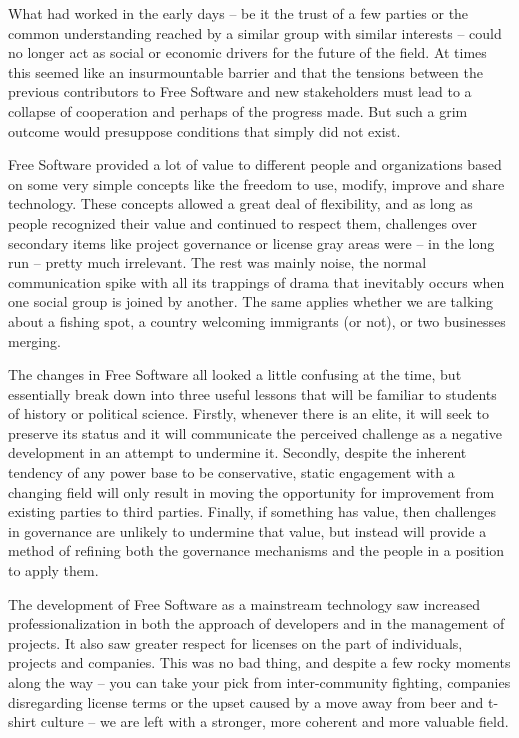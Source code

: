 What had worked in the early days -- be it the trust of a few parties or the
common understanding reached by a similar group with similar interests -- could
no longer act as social or economic drivers for the future of the field. At
times this seemed like an insurmountable barrier and that the tensions between
the previous contributors to Free Software and new stakeholders must lead to a
collapse of cooperation and perhaps of the progress made. But such a grim
outcome would presuppose conditions that simply did not exist.

Free Software provided a lot of value to different people and organizations
based on some very simple concepts like the freedom to use, modify, improve and
share technology. These concepts allowed a great deal of flexibility, and as
long as people recognized their value and continued to respect them, challenges
over secondary items like project governance or license gray areas were -- in
the long run -- pretty much irrelevant. The rest was mainly noise, the normal
communication spike with all its trappings of drama that inevitably occurs when
one social group is joined by another. The same applies whether we are talking
about a fishing spot, a country welcoming immigrants (or not), or two businesses
merging.

The changes in Free Software all looked a little confusing at the time, but
essentially break down into three useful lessons that will be familiar to
students of history or political science. Firstly, whenever there is an elite,
it will seek to preserve its status and it will communicate the perceived
challenge as a negative development in an attempt to undermine it. Secondly,
despite the inherent tendency of any power base to be conservative, static
engagement with a changing field will only result in moving the opportunity for
improvement from existing parties to third parties. Finally, if something has
value, then challenges in governance are unlikely to undermine that value, but
instead will provide a method of refining both the governance mechanisms and the
people in a position to apply them.

The development of Free Software as a mainstream technology saw increased
professionalization in both the approach of developers and in the management of
projects. It also saw greater respect for licenses on the part of individuals,
projects and companies. This was no bad thing, and despite a few rocky moments
along the way -- you can take your pick from inter-community fighting, companies
disregarding license terms or the upset caused by a move away from beer and
t-shirt culture -- we are left with a stronger, more coherent and more valuable
field.
